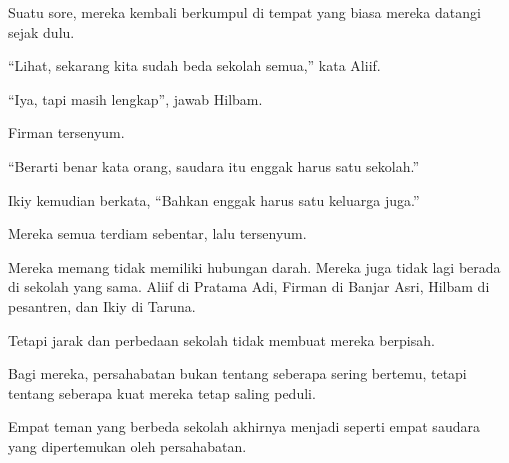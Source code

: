 Suatu sore, mereka kembali berkumpul di tempat yang biasa mereka datangi sejak dulu.

``Lihat, sekarang kita sudah beda sekolah semua,'' kata Aliif.

``Iya, tapi masih lengkap'', jawab Hilbam.

Firman tersenyum.

``Berarti benar kata orang, saudara itu enggak harus satu sekolah.''

Ikiy kemudian berkata, ``Bahkan enggak harus satu keluarga juga.''

Mereka semua terdiam sebentar, lalu tersenyum.

Mereka memang tidak memiliki hubungan darah. Mereka juga tidak lagi berada di sekolah yang sama. Aliif di Pratama Adi, Firman di Banjar Asri, Hilbam di pesantren, dan Ikiy di Taruna.

Tetapi jarak dan perbedaan sekolah tidak membuat mereka berpisah.

Bagi mereka, persahabatan bukan tentang seberapa sering bertemu, tetapi tentang seberapa kuat mereka tetap saling peduli.

Empat teman yang berbeda sekolah akhirnya menjadi seperti empat saudara yang dipertemukan oleh persahabatan.

\jedahias
